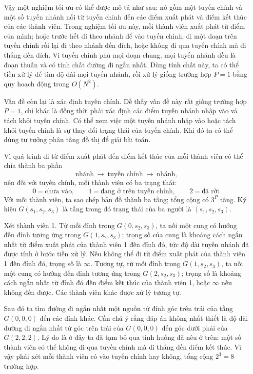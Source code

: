 \documentclass[11pt]{article}
\begin{document}
Vậy một nghiệm tối ưu có thể được mô tả như sau: nó gồm một tuyến chính và
một số tuyến nhánh nối từ tuyến chính đến các điểm xuất phát và điểm kết thúc
của các thành viên. Trong nghiệm tối ưu này, mỗi thành viên xuất phát từ điểm
của mình; hoặc trước hết đi theo nhánh để vào tuyến chính, đi một đoạn trên
tuyến chính rồi lại đi theo nhánh đến đích, hoặc không đi qua tuyến chính mà
đi thẳng đến đích. Vì tuyến chính phủ mọi đoạn chung, mọi tuyến nhánh đều là
đoạn thuần và có tính chất đường đi ngắn nhất. Dùng tính chất này, ta có thể
tiền xử lý để tìm độ dài mọi tuyến nhánh, rồi xử lý giống trường hợp $P=1$
bằng quy hoạch động trong $O(N^2)$.

Vấn đề còn lại là xác định tuyến chính. Dễ thấy vấn đề này rất giống trường
hợp $P=1$, chỉ khác là đồng thời phải xác định các điểm tuyến nhánh nhập vào
và tách khỏi tuyến chính. Có thể xem việc một tuyến nhánh nhập vào hoặc tách
khỏi tuyến chính là sự thay đổi trạng thái của tuyến chính. Khi đó ta có thể
dùng tư tưởng phân tầng đồ thị để giải bài toán.

Vì quá trình đi từ điểm xuất phát đến điểm kết thúc của mỗi thành viên có thể
chia thành ba phần
\[
  \text{nhánh}\ \longrightarrow\ \text{tuyến chính}\ \longrightarrow\ \text{nhánh},
\]
nên đối với tuyến chính, mỗi thành viên có ba trạng thái:
\[
  0=\text{chưa vào},\qquad 1=\text{đang ở trên tuyến chính},\qquad
  2=\text{đã rời}.
\]
Với mỗi thành viên, ta sao chép bản đồ thành ba tầng; tổng cộng có $3^P$ tầng.
Ký hiệu $G(s_1,s_2,s_3)$ là tầng trong đó trạng thái của ba người là
$(s_1,s_2,s_3)$.

Xét thành viên 1. Từ mỗi đỉnh trong $G(0,s_2,s_3)$, ta nối một cung có hướng
đến đỉnh tương ứng trong $G(1,s_2,s_3)$; trọng số của cung là khoảng cách
ngắn nhất từ điểm xuất phát của thành viên 1 đến đỉnh đó, tức độ dài tuyến
nhánh đã được tính ở bước tiền xử lý. Nếu không thể đi từ điểm xuất phát của
thành viên 1 đến đỉnh đó, trọng số là $\infty$. Tương tự, từ mỗi đỉnh trong
$G(1,s_2,s_3)$, ta nối một cung có hướng đến đỉnh tương ứng trong
$G(2,s_2,s_3)$; trọng số là khoảng cách ngắn nhất từ đỉnh đó đến điểm kết thúc
của thành viên 1, hoặc $\infty$ nếu không đến được. Các thành viên khác được
xử lý tương tự.

Sau đó ta tìm đường đi ngắn nhất một nguồn từ đỉnh góc trên trái của tầng
$G(0,0,0)$ đến các đỉnh khác. Cần chú ý rằng đáp án không nhất thiết là độ
dài đường đi ngắn nhất từ góc trên trái của $G(0,0,0)$ đến góc dưới phải của
$G(2,2,2)$. Lý do là ở đây ta đã tạm bỏ qua tình huống đã nêu ở trên: một số
thành viên có thể không đi qua tuyến chính mà đi thẳng đến điểm kết thúc. Vì
vậy phải xét mỗi thành viên có vào tuyến chính hay không, tổng cộng $2^3=8$
trường hợp.
\end{document}

